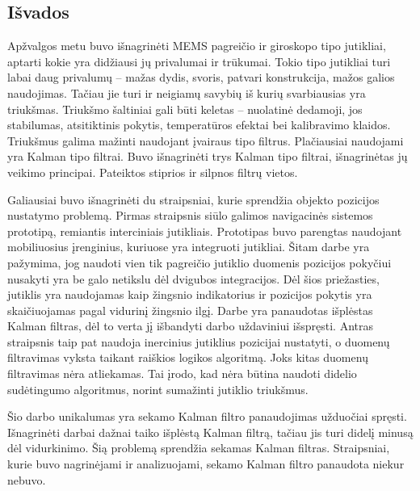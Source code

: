 \subsection{Išvados}

Apžvalgos metu buvo išnagrinėti MEMS pagreičio ir giroskopo tipo jutikliai, aptarti kokie yra didžiausi jų privalumai ir trūkumai.
Tokio tipo jutikliai turi labai daug privalumų -- mažas dydis, svoris, patvari konstrukcija, mažos galios naudojimas.
Tačiau jie turi ir neigiamų savybių iš kurių svarbiausias yra triukšmas.
Triukšmo šaltiniai gali būti keletas -- nuolatinė dedamoji, jos stabilumas, atsitiktinis pokytis, temperatūros efektai bei kalibravimo klaidos.
Triukšmus galima mažinti naudojant įvairaus tipo filtrus.
Plačiausiai naudojami yra Kalman tipo filtrai.
Buvo išnagrinėti trys Kalman tipo filtrai, išnagrinėtas jų veikimo principai.
Pateiktos stiprios ir silpnos filtrų vietos.

Galiausiai buvo išnagrinėti du straipsniai, kurie sprendžia objekto pozicijos nustatymo problemą.
Pirmas straipsnis siūlo galimos navigacinės sistemos prototipą, remiantis interciniais jutikliais.
Prototipas buvo parengtas naudojant mobiliuosius įrenginius, kuriuose yra integruoti jutikliai.
Šitam darbe yra pažymima, jog naudoti vien tik pagreičio jutiklio duomenis pozicijos pokyčiui nusakyti yra be galo netikslu dėl dvigubos integracijos.
Dėl šios priežasties, jutiklis yra naudojamas kaip žingsnio indikatorius ir pozicijos pokytis yra skaičiuojamas pagal vidurinį žingsnio ilgį.
Darbe yra panaudotas išplėstas Kalman filtras, dėl to verta jį išbandyti darbo uždaviniui išspręsti.
Antras straipsnis taip pat naudoja inercinius jutiklius pozicijai nustatyti, o duomenų filtravimas vyksta taikant raiškios logikos algoritmą.
Joks kitas duomenų filtravimas nėra atliekamas.
Tai įrodo, kad nėra būtina naudoti didelio sudėtingumo algoritmus, norint sumažinti jutiklio triukšmus.

Šio darbo unikalumas yra sekamo Kalman filtro panaudojimas užduočiai spręsti. 
Išnagrinėti darbai dažnai taiko išplėstą Kalman filtrą, tačiau jis turi didelį minusą dėl vidurkinimo.
Šią problemą sprendžia sekamas Kalman filtras.
Straipsniai, kurie buvo nagrinėjami ir analizuojami, sekamo Kalman filtro panaudota niekur nebuvo.